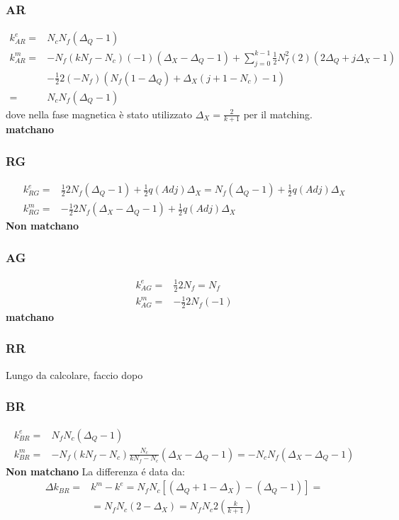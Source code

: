 \documentclass[a4paper,12pt]{article}
\begin{document}
  \subsubsection*{AR}
  \begin{align*}
   k^e_{AR} = & N_c N_f (\Delta_Q - 1) \\
   k^m_{AR} = & - N_f( k N_f - N_c) (-1) ( \Delta_X - \Delta_Q - 1 ) + \sum_{j=0}^{k-1} \frac{1}{2} N_f^2 (2) ( 2 \Delta_Q + j \Delta_X - 1) \\
   & - \frac{1}{2} 2 (-N_f) \left( N_f (1-\Delta_Q) + \Delta_X( j+1 - N_c) -1 \right) \\ =
   & N_c N_f ( \Delta_Q -1 )
  \end{align*}
  dove nella fase magnetica è stato utilizzato $\Delta_X = \frac{2}{k+1}$ per il matching.\\
  \textbf{matchano}


\subsubsection*{RG}
\begin{align*}
k^e_{RG} = & \frac{1}{2} 2 N_f ( \Delta_Q -1) + \frac{1}{2} q(Adj) \Delta_X = N_f ( \Delta_Q -1)+ \frac{1}{2} q(Adj) \Delta_X \\
k^m_{RG} = & - \frac{1}{2}  2 N_f ( \Delta_X - \Delta_Q -1)+ \frac{1}{2} q(Adj) \Delta_X
\end{align*}
\textbf{Non  matchano}

\subsubsection*{AG}
\begin{align*}
k^e_{AG} = & \frac{1}{2}  2 N_f = N_f \\
k^m_{AG} = & - \frac{1}{2}  2 N_f ( -1)
\end{align*}
\textbf{matchano}
	\subsubsection*{RR}
  
	 Lungo da calcolare, faccio dopo
  \subsubsection*{BR}
  \begin{align*}
   k^e_{BR} = & N_f N_c ( \Delta_Q - 1)\\
   k^m_{BR} = & - N_f (k N_f - N_c) \frac{N_c}{k N_f - N_c} ( \Delta_X - \Delta_Q -1) = - N_c N_f ( \Delta_X - \Delta_Q -1)
  \end{align*}
  \textbf{Non matchano}
   La differenza \'e data da:
   \begin{align*}
   \Delta k_{BR} =& k^m - k^e = N_f N_c [ (\Delta_Q +1 - \Delta_X ) - (\Delta_Q -1)] = \\
   & = N_f N_c ( 2 - \Delta_X) = N_f N_c 2 \left( \frac{k}{k+1} \right)
   \end{align*}
\end{document}

